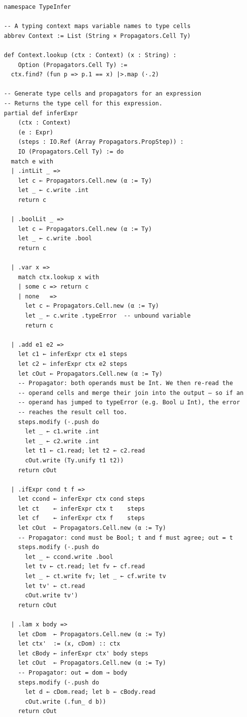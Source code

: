 \documentclass[12pt, a4paper, openright]{book}
\theoremstyle{thmstyle}
\theoremstyle{defstyle}
\begin{document}
\begin{verbatim}
namespace TypeInfer

-- A typing context maps variable names to type cells
abbrev Context := List (String × Propagators.Cell Ty)

def Context.lookup (ctx : Context) (x : String) :
    Option (Propagators.Cell Ty) :=
  ctx.find? (fun p => p.1 == x) |>.map (·.2)

-- Generate type cells and propagators for an expression
-- Returns the type cell for this expression.
partial def inferExpr
    (ctx : Context)
    (e : Expr)
    (steps : IO.Ref (Array Propagators.PropStep)) :
    IO (Propagators.Cell Ty) := do
  match e with
  | .intLit _ =>
    let c ← Propagators.Cell.new (α := Ty)
    let _ ← c.write .int
    return c

  | .boolLit _ =>
    let c ← Propagators.Cell.new (α := Ty)
    let _ ← c.write .bool
    return c

  | .var x =>
    match ctx.lookup x with
    | some c => return c
    | none   =>
      let c ← Propagators.Cell.new (α := Ty)
      let _ ← c.write .typeError  -- unbound variable
      return c

  | .add e1 e2 =>
    let c1 ← inferExpr ctx e1 steps
    let c2 ← inferExpr ctx e2 steps
    let cOut ← Propagators.Cell.new (α := Ty)
    -- Propagator: both operands must be Int. We then re-read the
    -- operand cells and merge their join into the output — so if an
    -- operand has jumped to typeError (e.g. Bool ⊔ Int), the error
    -- reaches the result cell too.
    steps.modify (·.push do
      let _ ← c1.write .int
      let _ ← c2.write .int
      let t1 ← c1.read; let t2 ← c2.read
      cOut.write (Ty.unify t1 t2))
    return cOut

  | .ifExpr cond t f =>
    let ccond ← inferExpr ctx cond steps
    let ct    ← inferExpr ctx t    steps
    let cf    ← inferExpr ctx f    steps
    let cOut  ← Propagators.Cell.new (α := Ty)
    -- Propagator: cond must be Bool; t and f must agree; out = t
    steps.modify (·.push do
      let _ ← ccond.write .bool
      let tv ← ct.read; let fv ← cf.read
      let _ ← ct.write fv; let _ ← cf.write tv
      let tv' ← ct.read
      cOut.write tv')
    return cOut

  | .lam x body =>
    let cDom  ← Propagators.Cell.new (α := Ty)
    let ctx'  := (x, cDom) :: ctx
    let cBody ← inferExpr ctx' body steps
    let cOut  ← Propagators.Cell.new (α := Ty)
    -- Propagator: out = dom → body
    steps.modify (·.push do
      let d ← cDom.read; let b ← cBody.read
      cOut.write (.fun_ d b))
    return cOut


\end{verbatim}
\end{document}
